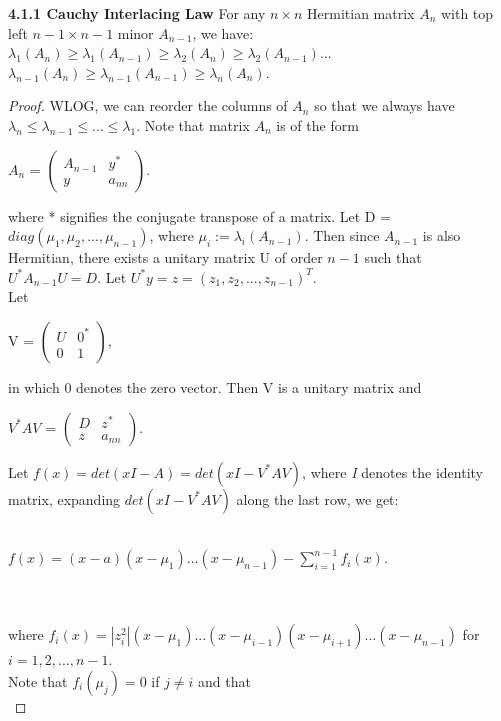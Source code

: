 \documentclass{article}
\begin{document}
\textbf{4.1.1 Cauchy Interlacing Law} For any $n\times n$ Hermitian matrix $A_n$ with top left $n-1 \times n-1$ minor $A_{n-1}$, we have:\\
$\lambda_1(A_n) \geq \lambda_1 (A_{n-1}) \geq \lambda_2(A_n) \geq \lambda_2 (A_{n-1})$...$\lambda_{n-1}(A_n) \geq \lambda_{n-1}(A_{n-1}) \geq \lambda_n (A_n)$.
\begin{proof}
WLOG, we can reorder the columns of $A_n$ so that we always have $\lambda_n \leq \lambda_{n-1} \leq ... \leq \lambda_1$.
Note that matrix $A_n$ is of the form \\
\begin{center}
    $A_n$ = $
\left(
\begin{array}{ccc}
A_{n-1} &y^* \\
y &a_{nn}
\end{array}
\right) $.
\end{center}
where * signifies the conjugate transpose of a matrix. Let D = $diag(\mu_1, \mu_2,..., \mu_{n-1})$, where $\mu_i := \lambda_{i}(A_{n-1})$. Then since $A_{n-1}$ is also Hermitian, there exists a unitary matrix U of order $n - 1$ such that $U^* A_{n-1}U = D$. Let $U^*y = z = (z_1, z_2, ..., z_{n-1})^T$.\\
Let
\begin{center}
    V = $
\left(
\begin{array}{ccc}
U &0^* \\
0 &1
\end{array}
\right) $,
\end{center}
in which 0 denotes the zero vector. Then V is a unitary matrix and
\begin{center}
    $V^*AV$ = $
\left(
\begin{array}{ccc}
D &z^* \\
z &a_{nn}
\end{array}
\right) $.
\end{center}
Let $f(x) = det(xI-A)= det(xI- V^*AV)$, where \textit{I} denotes the identity matrix, expanding $det(xI - V^*AV)$ along the last row, we get:\\
\\
\centerline{$f(x) = (x-a)(x-\mu_1)...(x - \mu_{n-1})-\sum\limits_{i = 1}^{n-1} f_i(x)$.}
\\
\\
where $f_i(x) = \left| z_i^2 \right| (x - \mu_1)...(x - \mu_{i-1})(x - \mu_{i+1})...(x - \mu_{n-1})$ for $i = 1, 2, ..., n-1$.\\
Note that $f_i(\mu_j) = 0$ if $j \neq i$ and that \\

\end{proof}
\end{document}
